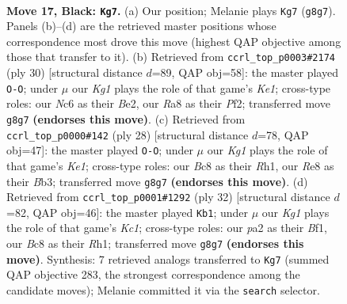 \documentclass[11pt]{article}
\begin{document}
\clearpage

\begin{figure}[p]\centering
\begin{subfigure}{0.46\textwidth}\centering
\resizebox{\linewidth}{!}{%
\newchessgame
\chessboard[
  setfen={r1b1r1k1/1pp2p1p/2nq1b2/p2p4/3P4/NP2P1P1/P4P2/RNBQRK2 b - - 0 17},
  showmover=false,
  pgfstyle=straightmove, color=movearrow, markmove={g8-g7}
]}
\caption{}
\end{subfigure}\hfill
\begin{subfigure}{0.46\textwidth}\centering
\resizebox{\linewidth}{!}{%
\newchessgame
\chessboard[
  setfen={rn3rk1/p2qbppp/4p3/1p6/2pPQ3/2N1PP2/1P2BP1P/R3K2R w KQ - 4 16},
  showmover=false,
  pgfstyle=straightmove, color=movearrow, markmove={e1-g1}
]}
\caption{}
\end{subfigure}
\\[4pt]
\begin{subfigure}{0.46\textwidth}\centering
\resizebox{\linewidth}{!}{%
\newchessgame
\chessboard[
  setfen={rn1qr1k1/5pbp/p1p2np1/1p6/8/PBN1BP2/1PQ2PPP/R3K2R w KQ - 0 15},
  showmover=false,
  pgfstyle=straightmove, color=movearrow, markmove={e1-g1}
]}
\caption{}
\end{subfigure}\hfill
\begin{subfigure}{0.46\textwidth}\centering
\resizebox{\linewidth}{!}{%
\newchessgame
\chessboard[
  setfen={r1r3k1/2q1bpp1/p1np1n1p/4pP2/4P3/2Q2P2/PPP1NB1P/2KR1B1R w - - 3 17},
  showmover=false,
  pgfstyle=straightmove, color=movearrow, markmove={c1-b1}
]}
\caption{}
\end{subfigure}
\caption{\textbf{Move 17, Black: \texttt{Kg7}.} (a) Our position; Melanie plays \texttt{Kg7} (\texttt{g8g7}). Panels (b)--(d) are the retrieved master positions whose correspondence most drove this move (highest QAP objective among those that transfer to it). (b) Retrieved from \texttt{ccrl\_top\_p0003\#2174} (ply 30) [structural distance $d$=89, QAP obj=58]: the master played \texttt{O-O}; under $\mu$ our \emph{Kg1} plays the role of that game's \emph{Ke1}; cross-type roles: our \emph{N}c6 as their \emph{B}e2, our \emph{R}a8 as their \emph{P}f2; transferred move \texttt{g8g7} \textbf{(endorses this move)}. (c) Retrieved from \texttt{ccrl\_top\_p0000\#142} (ply 28) [structural distance $d$=78, QAP obj=47]: the master played \texttt{O-O}; under $\mu$ our \emph{Kg1} plays the role of that game's \emph{Ke1}; cross-type roles: our \emph{B}c8 as their \emph{R}h1, our \emph{R}e8 as their \emph{B}b3; transferred move \texttt{g8g7} \textbf{(endorses this move)}. (d) Retrieved from \texttt{ccrl\_top\_p0001\#1292} (ply 32) [structural distance $d$=82, QAP obj=46]: the master played \texttt{Kb1}; under $\mu$ our \emph{Kg1} plays the role of that game's \emph{Kc1}; cross-type roles: our \emph{p}a2 as their \emph{B}f1, our \emph{B}c8 as their \emph{R}h1; transferred move \texttt{g8g7} \textbf{(endorses this move)}. Synthesis: 7 retrieved analogs transferred to \texttt{Kg7} (summed QAP objective 283, the strongest correspondence among the candidate moves); Melanie committed it via the \texttt{search} selector.}
\label{fig:thought-m33}
\end{figure}
\end{document}
